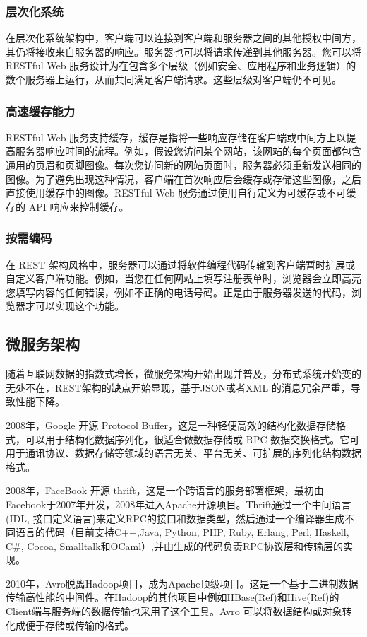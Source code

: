 \documentclass[a4paper,twoside]{scrbook}
\begin{document}
\begin{CJK}{UTF8}{gbsn}
\subsubsection{层次化系统}
在层次化系统架构中，客户端可以连接到客户端和服务器之间的其他授权中间方，其仍将接收来自服务器的响应。服务器也可以将请求传递到其他服务器。您可以将 RESTful Web 服务设计为在包含多个层级（例如安全、应用程序和业务逻辑）的数个服务器上运行，从而共同满足客户端请求。这些层级对客户端仍不可见。
\subsubsection{高速缓存能力}
RESTful Web 服务支持缓存，缓存是指将一些响应存储在客户端或中间方上以提高服务器响应时间的流程。例如，假设您访问某个网站，该网站的每个页面都包含通用的页眉和页脚图像。每次您访问新的网站页面时，服务器必须重新发送相同的图像。为了避免出现这种情况，客户端在首次响应后会缓存或存储这些图像，之后直接使用缓存中的图像。RESTful Web 服务通过使用自行定义为可缓存或不可缓存的 API 响应来控制缓存。
\subsubsection{按需编码}
在 REST 架构风格中，服务器可以通过将软件编程代码传输到客户端暂时扩展或自定义客户端功能。例如，当您在任何网站上填写注册表单时，浏览器会立即高亮您填写内容的任何错误，例如不正确的电话号码。正是由于服务器发送的代码，浏览器才可以实现这个功能。
\subsection{微服务架构}
随着互联网数据的指数式增长，微服务架构开始出现并普及，分布式系统开始变的无处不在，REST架构的缺点开始显现，基于JSON或者XML 的消息冗余严重，导致性能下降。

2008年，Google 开源 Protocol Buffer，这是一种轻便高效的结构化数据存储格式，可以用于结构化数据序列化，很适合做数据存储或 RPC 数据交换格式。它可用于通讯协议、数据存储等领域的语言无关、平台无关、可扩展的序列化结构数据格式。

2008年，FaceBook 开源 thrift，这是一个跨语言的服务部署框架，最初由Facebook于2007年开发，2008年进入Apache开源项目。Thrift通过一个中间语言(IDL, 接口定义语言)来定义RPC的接口和数据类型，然后通过一个编译器生成不同语言的代码（目前支持C++,Java, Python, PHP, Ruby, Erlang, Perl, Haskell, C\#, Cocoa, Smalltalk和OCaml）,并由生成的代码负责RPC协议层和传输层的实现。

2010年，Avro脱离Hadoop项目，成为Apache顶级项目。这是一个基于二进制数据传输高性能的中间件。在Hadoop的其他项目中例如HBase(Ref)和Hive(Ref)的Client端与服务端的数据传输也采用了这个工具。Avro 可以将数据结构或对象转化成便于存储或传输的格式。


\end{CJK}
\end{document}
